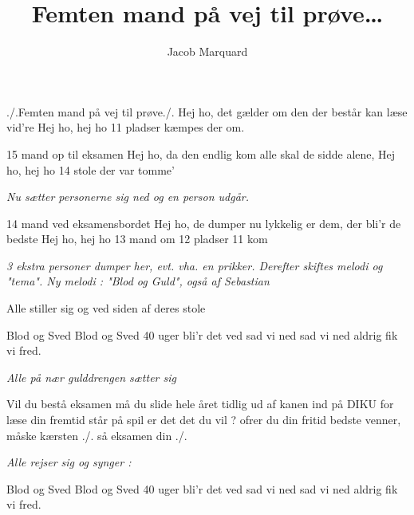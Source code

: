 \documentclass{article}
\title{Femten mand på vej til prøve\ldots}
\author{Jacob Marquard}
\begin{document}
\begin{song}
    ./.Femten mand på vej til prøve./.
                Hej ho, det gælder om
                den der består kan læse vid're
                Hej ho, hej ho
                11 pladser kæmpes der om.

                15 mand op til eksamen 
                Hej ho, da den endlig kom
                alle skal de sidde alene,
                Hej ho, hej ho 
                14 stole der var tomme'

{\em Nu sætter personerne sig ned og en person udgår.}

                14 mand ved eksamensbordet
                Hej ho, de dumper nu
                lykkelig er dem, der bli'r de bedste
                Hej ho, hej ho
                13 mand om 12
                pladser
                11
                kom

{\em 3 ekstra personer dumper her, evt. vha. en prikker. Derefter skiftes %
  melodi og "tema".
Ny melodi : "Blod og Guld", også af Sebastian

Alle stiller sig og ved siden af deres stole}

                Blod og Sved
                Blod og Sved
                40 uger bli'r det ved
                sad vi ned
                sad vi ned
                aldrig  fik vi fred.

{\em Alle på nær gulddrengen sætter sig}

Vil du bestå eksamen
                må du slide hele året
                tidlig ud af kanen
                ind på DIKU for læse
                din fremtid står på spil
                er det det du vil ?
                ofrer du din fritid
                bedste venner, måske kærsten
                ./. så eksamen din ./.

{\em Alle rejser sig og synger :}

    Blod og Sved
                Blod og Sved
                40 uger bli'r det ved
                sad vi ned
                sad vi ned
                aldrig  fik vi fred.


\end{song}
\end{document}
